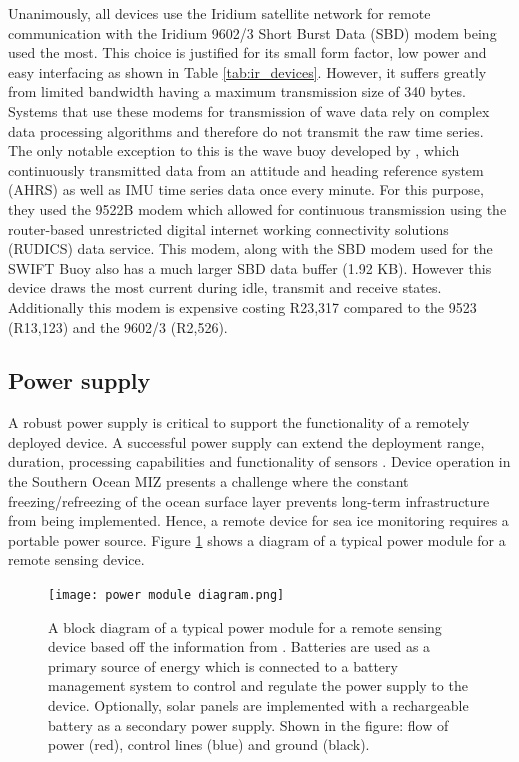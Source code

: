 Unanimously, all devices use the Iridium satellite network for remote communication with the Iridium 9602/3 Short Burst Data (SBD) modem being used the most. This choice is justified for its small form factor, low power and easy interfacing as shown in Table \ref{tab:ir_devices}. However, it suffers greatly from limited bandwidth having a maximum transmission size of 340 bytes. Systems that use these modems for transmission of wave data rely on complex data processing algorithms and therefore do not transmit the raw time series. The only notable exception to this is the wave buoy developed by \textcite{doble2017robust}, which continuously transmitted  data from an attitude and heading reference system (AHRS) as well as IMU time series data once every minute. For this purpose, they used the 9522B modem which allowed for continuous transmission using the router-based unrestricted digital internet working connectivity solutions (RUDICS) data service. This modem, along with the SBD modem used for the SWIFT Buoy also has a much larger SBD data buffer (1.92 KB). However this device draws the most current during idle, transmit and receive states. Additionally this modem is expensive costing R23,317 compared to the 9523 (R13,123) and the 9602/3 (R2,526).  

\subsection{Power supply}

A robust power supply is critical to support the functionality of a remotely deployed device. A successful power supply can extend the deployment range, duration, processing capabilities and functionality of sensors \cite{kennicutt2016delivering}. Device operation in the Southern Ocean MIZ presents a challenge where the constant freezing/refreezing of the ocean surface layer prevents long-term infrastructure from being implemented. Hence, a remote device for sea ice monitoring requires a portable power source. Figure \ref{fig:powermoddiag} shows a diagram of a typical power module for a remote sensing device.

\begin{figure}[H]
	\centering
	\texttt{[image: power module diagram.png]}
	\caption{A block diagram of a typical power module for a remote sensing device based off the information from \textcite{rabault2019open,doble2017robust,vidal2019xev}. Batteries are used as a primary source of energy which is connected to a battery management system to control and regulate the power supply to the device. Optionally, solar panels are implemented with a rechargeable battery as a secondary power supply. Shown in the figure: flow of power (red), control lines (blue) and ground (black).}
	\label{fig:powermoddiag}
\end{figure}

